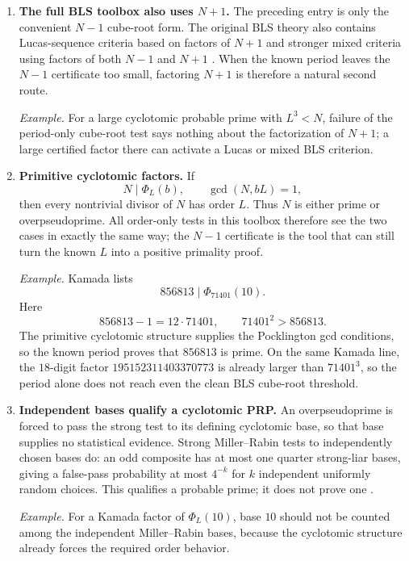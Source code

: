 \documentclass[11pt]{article}
\newcommand{\ord}{\operatorname{ord}}
\begin{document}
\begin{enumerate}[label=\textbf{T\arabic*.},leftmargin=2.2em,resume]
\smallskip
\noindent\emph{Example.}
Take $n=71$.  The element $b=20$ has
\[
\ord_{71}(20)=7,\qquad 71-1=10\cdot7,
\]
so $F_L=7$.  Since
\[
71=1\cdot7^2+3\cdot7+1
\]
and
\[
3^2-4\cdot1=5
\]
is not a square, the BLS cube-root criterion certifies $71$.

\item \textbf{The full BLS toolbox also uses $N+1$.}
The preceding entry is only the convenient $N-1$ cube-root form.  The
original BLS theory also contains Lucas-sequence criteria based on factors of
$N+1$ and stronger mixed criteria using factors of both $N-1$ and $N+1$
\cite{BLS1975}.  When the known period leaves the $N-1$ certificate too
small, factoring $N+1$ is therefore a natural second route.

\smallskip
\noindent\emph{Example.}
For a large cyclotomic probable prime with $L^3<N$, failure of the
period-only cube-root test says nothing about the factorization of $N+1$; a
large certified factor there can activate a Lucas or mixed BLS criterion.

\item \textbf{Primitive cyclotomic factors.}
If
\[
N\mid\Phi_L(b),\qquad \gcd(N,bL)=1,
\]
then every nontrivial divisor of $N$ has order $L$.  Thus $N$ is either
prime or overpseudoprime.  All order-only tests in this toolbox therefore
see the two cases in exactly the same way; the $N-1$ certificate is the
tool that can still turn the known $L$ into a positive primality proof.

\smallskip
\noindent\emph{Example.}
Kamada lists
\[
856813\mid\Phi_{71401}(10).
\]
Here
\[
856813-1=12\cdot71401,
\qquad
71401^2>856813.
\]
The primitive cyclotomic structure supplies the Pocklington gcd conditions,
so the known period proves that $856813$ is prime.  On the same Kamada line,
the $18$-digit factor $195152311403370773$ is already larger than
$71401^3$, so the period alone does not reach even the clean BLS cube-root
threshold.

\item \textbf{Independent bases qualify a cyclotomic PRP.}
An overpseudoprime is forced to pass the strong test to its defining
cyclotomic base, so that base supplies no statistical evidence.  Strong
Miller--Rabin tests to independently chosen bases do: an odd composite has at
most one quarter strong-liar bases, giving a false-pass probability at most
$4^{-k}$ for $k$ independent uniformly random choices.  This qualifies a
probable prime; it does not prove one \cite{CrandallPomerance}.

\smallskip
\noindent\emph{Example.}
For a Kamada factor of $\Phi_L(10)$, base $10$ should not be counted among
the independent Miller--Rabin bases, because the cyclotomic structure already
forces the required order behavior.


\end{enumerate}
\end{document}
